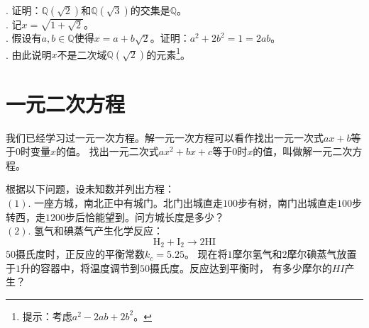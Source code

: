 \documentclass[12pt,UTF8,fontset=none]{ctexbook}
\begin{document}
\begin{xt}\label{xt:3-2-0}
    \mbox{}\\
    . 证明：$\mathbb{Q}(\sqrt{2})$和$\mathbb{Q}(\sqrt{3})$的交集是$\mathbb{Q}$。\\
    . 记$x = \sqrt{1 + \sqrt{2}}$。\\
    . 假设有$a,b\in\mathbb{Q}$使得$x = a + b\sqrt{2}$。证明：$a^2 + 2b^2 = 1 = 2ab$。\\
    . 由此说明$x$不是二次域$\mathbb{Q}(\sqrt{2})$的元素\footnote{提示：考虑$a^2 - 2ab + 2b^2$。}。
\end{xt}

\chapter{一元二次方程}
我们已经学习过一元一次方程。解一元一次方程可以看作找出一元一次式$ax + b$等于$0$时变量$x$的值。
找出一元二次式$ax^2 + bx + c$等于$0$时$x$的值，叫做解一元二次方程。

\begin{ex}\label{ex:4-0-0}
    根据以下问题，设未知数并列出方程：\\
    $(1).$ 一座方城，南北正中有城门。北门出城直走$100$步有树，南门出城直走$100$步转西，走$1200$步后恰能望到。问方城长度是多少？\\
    $(2).$ 氢气和碘蒸气产生化学反应：
    $$\mathrm{H}_2 + \mathrm{I}_2 \longrightarrow 2\mathrm{HI}$$
    $50$摄氏度时，正反应的平衡常数$k_c=5.25$。
    现在将$1$摩尔氢气和$2$摩尔碘蒸气放置于$1$升的容器中，将温度调节到$50$摄氏度。反应达到平衡时，
    有多少摩尔的$HI$产生？
\end{ex}
\end{document}
